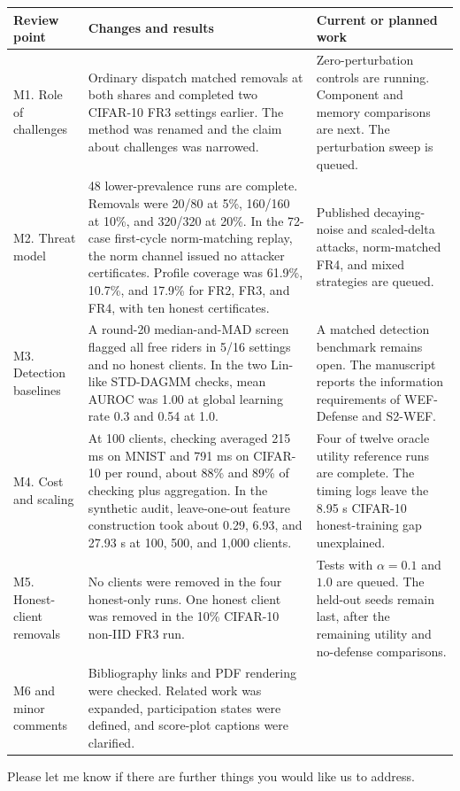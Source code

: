 \documentclass[11pt,a4paper]{article}
\begin{document}
\small
\begin{longtable}{@{}L{.20\textwidth} L{.43\textwidth} L{\dimexpr.37\tabcolsep\relax}@{}}
\toprule
Review point & Changes and results & Current or planned work \\
\midrule
\endhead
M1. Role of challenges &
Ordinary dispatch matched removals at both shares and completed two
CIFAR-10 FR3 settings earlier. The method was renamed and the claim about
challenges was narrowed. &
Zero-perturbation controls are running. Component and memory comparisons
are next. The perturbation sweep is queued. \\
\addlinespace
M2. Threat model &
48 lower-prevalence runs are complete. Removals were 20/80 at 5\%,
160/160 at 10\%, and 320/320 at 20\%. In the 72-case first-cycle
norm-matching replay, the norm channel issued no attacker certificates.
Profile coverage was 61.9\%, 10.7\%, and 17.9\% for FR2, FR3, and FR4,
with ten honest certificates. &
Published decaying-noise and scaled-delta attacks, norm-matched FR4,
and mixed strategies are queued. \\
\addlinespace
M3. Detection baselines &
A round-20 median-and-MAD screen flagged all free riders in 5/16 settings
and no honest clients. In the two Lin-like STD-DAGMM checks, mean AUROC
was 1.00 at global learning rate 0.3 and 0.54 at 1.0. &
A matched detection benchmark remains open. The manuscript reports the
information requirements of WEF-Defense and S2-WEF. \\
\addlinespace
M4. Cost and scaling &
At 100 clients, checking averaged 215 ms on MNIST and 791 ms on CIFAR-10
per round, about 88\% and 89\% of checking plus aggregation. In the
synthetic audit, leave-one-out feature construction took about 0.29,
6.93, and 27.93 s at 100, 500, and 1,000 clients. &
Four of twelve oracle utility reference runs are complete. The timing
logs leave the 8.95 s CIFAR-10 honest-training gap unexplained. \\
\addlinespace
M5. Honest-client removals &
No clients were removed in the four honest-only runs. One honest client
was removed in the 10\% CIFAR-10 non-IID FR3 run. &
Tests with $\alpha=0.1$ and $1.0$ are queued. The held-out seeds remain
last, after the remaining utility and no-defense comparisons. \\
\addlinespace
M6 and minor comments &
Bibliography links and PDF rendering were checked. Related work was
expanded, participation states were defined, and score-plot captions
were clarified. &
\\
\bottomrule
\end{longtable}
\normalsize

Please let me know if there are further things you would like us to address.
\end{document}
